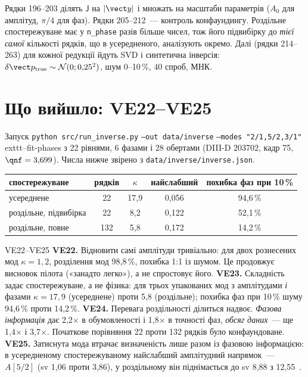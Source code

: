 
Рядки 196--203 ділять $\mathsf J$ на $|\vect y|$ і множать на масштаби параметрів ($A_0$ для амплітуд, $\pi/4$ для фаз). Рядки 205--212~--- контроль конфаундингу. Роздільне спостережуване має у \texttt{n\_phase} разів більше чисел, тож його підвибірку до \emph{тієї самої} кількості рядків, що в усередненого, аналізують окремо. Далі (рядки 214--263) для кожної редукції йдуть SVD і синтетична інверсія: $\delta\vect p_{\mathrm{true}}\sim\mathcal N(0;0{,}25^2)$, шум 0--10\,\%, 40 спроб, МНК.

\section{Що вийшло: VE22--VE25}\label{sec:g07-ve}

Запуск \texttt{python src/run\_inverse.py} \texttt{--out data/inverse} \texttt{--modes "2/1,5/2,3/1"} 	exttt{--fit-phases} з 22 рівнями, 6 фазами і 28 обертами (DIII-D 203702, кадр 75, $\qnf=3{,}699$). Числа нижче звірено з \texttt{data/inverse/inverse.json}.

\begin{center}\small
\begin{tabular}{lcccc}
\toprule
спостережуване & рядків & $\kappa$ & найслабший & похибка фаз при 10\,\%\\
\midrule
усереднене & 22 & 17,9 & 0,056 & 94,6\,\%\\
роздільне, підвибірка & 22 & 8,2 & 0,122 & 52,1\,\%\\
роздільне, повне & 132 & 5,8 & 0,172 & 14,2\,\%\\
\bottomrule
\end{tabular}
\end{center}

\begin{established}{VE22--VE25}
\textbf{VE22.} Відновити самі амплітуди тривіально: для двох рознесених мод $\kappa=1{,}2$, розділення мод 98,8\,\%, похибка 1:1 із шумом. Це продовжує висновок пілота («занадто легко»), а не спростовує його.
\textbf{VE23.} Складність задає спостережуване, а не фізика: для трьох упакованих мод з амплітудами \emph{і} фазами $\kappa=17{,}9$ (усереднене) проти 5,8 (роздільне); похибка фаз при 10\,\% шуму 94,6\,\% проти 14,2\,\%.
\textbf{VE24.} Перевага роздільності ділиться надвоє. \emph{Фазова інформація} дає 2,2$\times$ в обумовленості і 1,8$\times$ в точності фаз, \emph{обсяг даних}~--- ще 1,4$\times$ і 3,7$\times$. Початкове порівняння 22 проти 132 рядків було конфаундоване.
\textbf{VE25.} Затиснута мода втрачає визначеність лише разом із фазовою інформацією: в усередненому спостережуваному найслабший амплітудний напрямок~--- $A[5/2]$ (sv 1,06 проти 3,86), у роздільному він піднімається до sv 8,88 з 12,55~\cite{RegViz,g07Inverse}.
\end{established}

